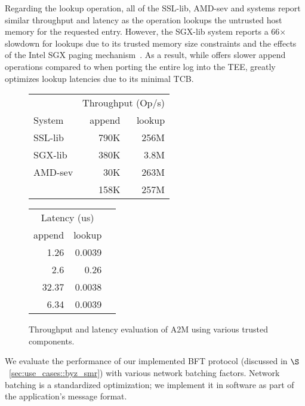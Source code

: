 Regarding the lookup operation, all of the SSL-lib, AMD-sev and \projecttitle{} systems report similar throughput and latency as the operation lookups the untrusted host memory for the requested entry. However, the SGX-lib system reports a 66$\times$ slowdown for lookups due to its trusted memory size constraints and the effects of the Intel SGX paging mechanism~\cite{treaty}. As a result, while \projecttitle{} offers slower append operations compared to when porting the entire log into the TEE, \projecttitle{} greatly optimizes lookup latencies due to its minimal TCB.



\begin{figure}[t!]
\begin{center}
\small
{}
  \centering
\begin{tabular}{lrr}
\hline
& \multicolumn{2}{c}{Throughput (Op/s)} \\
System          & append    & lookup  \\
\hline
SSL-lib         & 790K      & 256M      \\
SGX-lib             & 380K      & 3.8M       \\
AMD-sev         & 30K       & 263M      \\
\projecttitle{} & 158K      & 257M      \\
\hline
\end{tabular}
\endminipage
\hfill
{}
\centering
\begin{tabular}{rrr}
\hline
\multicolumn{2}{c}{Latency (us)} \\
 append     & lookup  \\
\hline
 1.26       & 0.0039      \\
 2.6        & 0.26       \\
 32.37      & 0.0038      \\
 6.34       & 0.0039      \\
 \hline
\end{tabular}
\endminipage
\end{center}
\caption{Throughput and latency evaluation of A2M using various trusted components.}%
\label{fig:a2m_eval}
\end{figure}

 We evaluate the performance of our implemented BFT protocol (discussed in $\S$~\ref{sec:use_cases::byz_smr}) with various network batching factors. Network batching is a standardized optimization; we implement it in software as part of the application's message format. 

